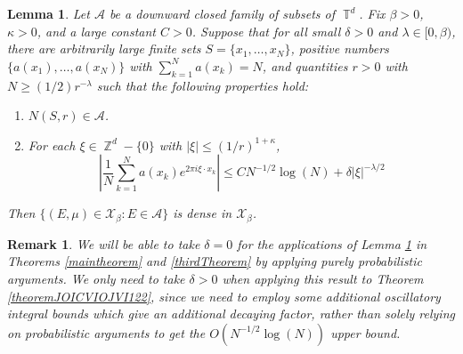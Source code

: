 \documentclass[dvipsnames,letterpaper,12pt]{article}
\numberwithin{equation}{section}
\DeclareMathOperator{\ZZ}{\mathbb{Z}}
\DeclareMathOperator{\TT}{\mathbb{T}}
\newtheorem{lemma}[theorem]{Lemma}
\newtheorem{remark}[theorem]{Remark}
\numberwithin{theorem}{section}
\begin{document}
\begin{lemma} \label{LemmaFIOAJFOIWJ}
    Let $\mathcal{A}$ be a downward closed family of subsets of $\TT^d$. Fix $\beta > 0$, $\kappa > 0$, and a large constant $C > 0$. Suppose that for all small $\delta > 0$ and $\lambda \in [0,\beta)$, there are arbitrarily large finite sets $S = \{ x_1,\dots,x_N \}$, positive numbers $\{ a(x_1), \dots, a(x_N) \}$ with $\sum_{k = 1}^N a(x_k) = N$, and quantities $r > 0$ with $N \geq (1/2) r^{-\lambda}$ such that the following properties hold:
    \begin{enumerate}
        \item[(1)] $N(S,r) \in \mathcal{A}$.
        \item[(2)] For each $\xi \in \ZZ^d - \{ 0 \}$ with $|\xi| \leq (1/r)^{1 + \kappa}$,
        \[ \left| \frac{1}{N} \sum_{k = 1}^N a(x_k) e^{2 \pi i \xi \cdot x_k} \right| \leq C N^{-1/2} \log(N) + \delta |\xi|^{-\lambda/2} \]
    \end{enumerate}
    Then $\{ (E,\mu) \in \mathcal{X}_\beta : E \in \mathcal{A} \}$ is dense in $\mathcal{X}_\beta$.
\end{lemma}

\begin{remark}
    We will be able to take $\delta = 0$ for the applications of Lemma \ref{LemmaFIOAJFOIWJ} in Theorems \ref{maintheorem} and \ref{thirdTheorem} by applying purely probabilistic arguments. We only need to take $\delta > 0$ when applying this result to Theorem \ref{theoremJOICVIOJVI122}, since we need to employ some additional oscillatory integral bounds which give an additional decaying factor, rather than solely relying on probabilistic arguments to get the $O(N^{-1/2} \log(N))$ upper bound.
\end{remark}
\end{document}
